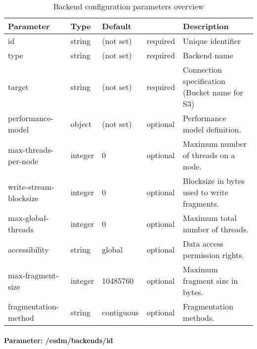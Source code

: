 \begin{preserve}
\begin{table}[!h]
  \begin{center}
    \begin{scriptsize}
      \begin{tabularx}{\textwidth}{llllX}
        Parameter              & Type    & Default    &          & Description \\
        \hline
        id                     & string  & (not set)  & required & Unique identifier \\
        type                   & string  & (not set)  & required & Backend name \\
        target                 & string  & (not set)  & required & Connection specification (Bucket name for S3) \\
        performance-model      & object  & (not set)  & optional & Performance model definition.\\
        max-threads-per-node   & integer & 0          & optional & Maximum number of threads on a node. \\
        write-stream-blocksize & integer & 0          & optional & Blocksize in bytes used to write fragments. \\
        max-global-threads     & integer & 0          & optional & Maximum total number of threads. \\
        accessibility          & string  & global     & optional & Data access permission rights. \\
        max-fragment-size      & integer & 10485760   & optional & Maximum fragment size in bytes. \\
        fragmentation-method   & string  & contiguous & optional & Fragmentation methods.\\
      \end{tabularx}
    \end{scriptsize}
  \end{center}
  \caption{Backend configuration parameters overview}%
  \label{tab:backend_conf_params}
\end{table}
\end{preserve}

\begin{preserve}
\def\gapsize{1cm}
\end{preserve}
\def\gapsize{1cm}


\paragraph{Parameter: /esdm/backends/id}

